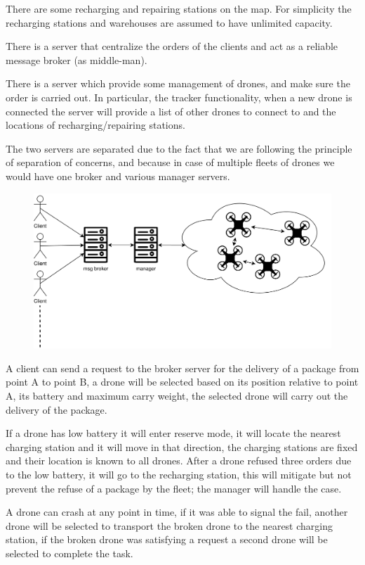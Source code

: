 \documentclass[a4paper, oneside]{memoir}
\begin{document}
There are some recharging and repairing stations on the map. For simplicity the recharging stations and warehouses are assumed to have unlimited capacity.

There is a server that centralize the orders of the clients and act as a reliable message broker (as middle-man).

There is a server which provide some management of drones, and make sure the order is carried out. In particular, the tracker functionality, when a new drone is connected the server will provide a list of other drones to connect to and the locations of recharging/repairing stations.

The two servers are separated due to the fact that we are following the principle of separation of concerns, and because in case of multiple fleets of drones we would have one broker and various manager servers.

\begin{figure}[h!]
	\centering
	\includegraphics[width=\linewidth]{Overview}
\end{figure}

A client can send a request to the broker server for the delivery of a package from point A to point B, a drone will be selected based on its position relative to point A, its  battery and maximum carry weight, the selected drone will carry out the delivery of the package.

If a drone has low battery it will enter reserve mode, it will locate the nearest charging station and it will move in that direction, the charging stations are fixed and their location is known to all drones. After a drone refused three orders due to the low battery, it will go to the recharging station, this will mitigate but not prevent the refuse of a package by the fleet; the manager will handle the case.

A drone can crash at any point in time, if it was able to signal the fail, another drone will be selected to transport the broken drone to the nearest charging station, if the broken drone was satisfying a request a second drone will be selected to complete the task.
\end{document}
